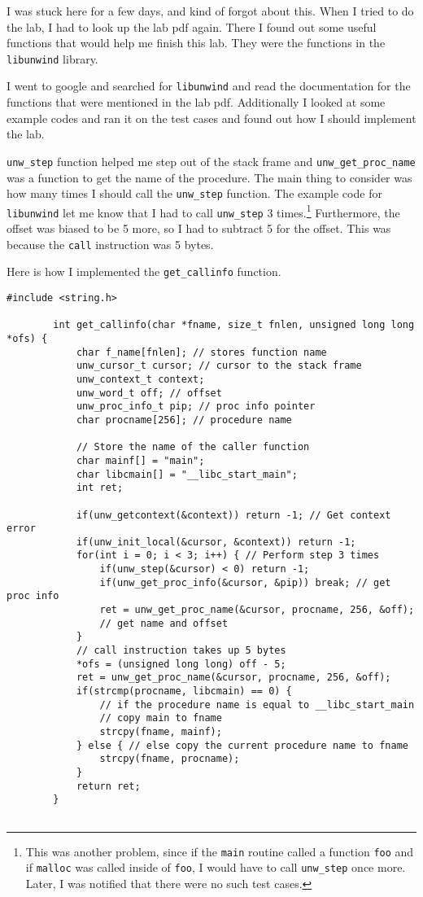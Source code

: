 \documentclass[12pt]{report}
\begin{document}
I was stuck here for a few days, and kind of forgot about this. When I tried to do the lab, I had to look up the lab pdf again. There I found out some useful functions that would help me finish this lab. They were the functions in the \texttt{libunwind} library.

I went to google and searched for \texttt{libunwind} and read the documentation for the functions that were mentioned in the lab pdf. Additionally I looked at some example codes and ran it on the test cases and found out how I should implement the lab.

\texttt{unw\_step} function helped me step out of the stack frame and \texttt{unw\_get\_proc\_name} was a function to get the name of the procedure. The main thing to consider was how many times I should call the \texttt{unw\_step} function. The example code for \texttt{libunwind} let me know that I had to call \texttt{unw\_step} 3 times.\footnote{This was another problem, since if the \texttt{main} routine called a function \texttt{foo} and if \texttt{malloc} was called inside of \texttt{foo}, I would have to call \texttt{unw\_step} once more. Later, I was notified that there were no such test cases.}
Furthermore, the offset was biased to be 5 more, so I had to subtract 5 for the offset. This was because the \texttt{call} instruction was 5 bytes.

Here is how I implemented the \texttt{get\_callinfo} function.
	\begin{lstlisting}[style=Cstyle]
		#include <string.h>
		
		int get_callinfo(char *fname, size_t fnlen, unsigned long long *ofs) {
			char f_name[fnlen]; // stores function name
			unw_cursor_t cursor; // cursor to the stack frame
			unw_context_t context;
			unw_word_t off; // offset
			unw_proc_info_t pip; // proc info pointer
			char procname[256]; // procedure name
			
			// Store the name of the caller function
			char mainf[] = "main";
			char libcmain[] = "__libc_start_main";
			int ret;
			
			if(unw_getcontext(&context)) return -1; // Get context error
			if(unw_init_local(&cursor, &context)) return -1;
			for(int i = 0; i < 3; i++) { // Perform step 3 times
				if(unw_step(&cursor) < 0) return -1;
				if(unw_get_proc_info(&cursor, &pip)) break; // get proc info
				ret = unw_get_proc_name(&cursor, procname, 256, &off); 
				// get name and offset
			}
			// call instruction takes up 5 bytes
			*ofs = (unsigned long long) off - 5; 
			ret = unw_get_proc_name(&cursor, procname, 256, &off);
			if(strcmp(procname, libcmain) == 0) { 
				// if the procedure name is equal to __libc_start_main
				// copy main to fname
				strcpy(fname, mainf);
			} else { // else copy the current procedure name to fname
				strcpy(fname, procname);
			}
			return ret;
		}
		
	\end{lstlisting}
\end{document}

